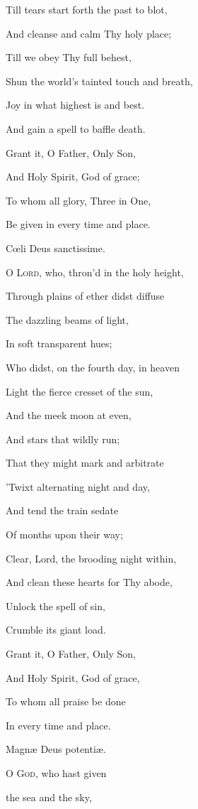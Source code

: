 Till tears start forth the past to blot,

And cleanse and calm Thy holy place; 

Till we obey Thy full behest,

Shun the world's tainted touch and breath,

Joy in what highest is and best.

And gain a spell to baffle death.

Grant it, O Father, Only Son,

And Holy Spirit, God of grace;

To whom all glory, Three in One,

Be given in every time and place.


Cœli Deus sanctissime.

O L\textsc{ord}, who, thron'd in the holy height,

Through plains of ether didst diffuse

The dazzling beams
of light,

In soft transparent hues;

Who didst, on the fourth day, in heaven

Light the fierce cresset of the sun,

And the meek moon
at even,

And stars that wildly run;

That they might mark and arbitrate

'Twixt alternating night and day,

And tend the train
sedate

Of months upon their way; 

Clear, Lord, the brooding night within,

And clean these hearts for Thy abode,

Unlock the spell of
sin,

Crumble its giant load.

Grant it, O Father, Only Son,

And Holy Spirit, God of grace,

To whom all praise
be done

In every time and place.


Magnæ Deus potentiæ.

O G\textsc{od}, who hast given

the sea and the sky,

